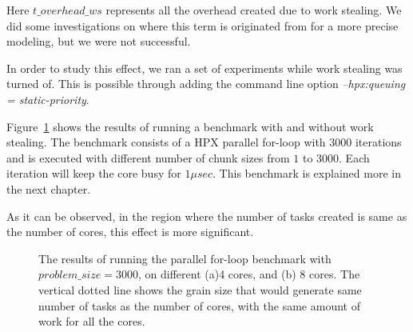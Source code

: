 Here $t\_{overhead\_{ws}}$ represents all the overhead created due to work stealing. We did some investigations on where this term is originated from for a more precise modeling, but we were not successful. 

In order to study this effect, we ran a set of experiments while work stealing was turned of. This is possible through adding the command line option \emph{--hpx:queuing = static-priority}.

Figure~\ref{fig40} shows the results of running a benchmark with and without work stealing. The benchmark consists of a HPX parallel for-loop with $3000$ iterations and is executed with different number of chunk sizes from $1$ to $3000$. Each iteration will keep the core busy for $1\mu{sec}$. This benchmark is explained more in the next chapter.

As it can be observed, in the region where the number of tasks created is same as the number of cores, this effect is more significant.

\vspace{\baselineskip}	
\begin{figure}[H]
	\centering
	\caption{The results of running the parallel for-loop benchmark with $problem\_size=3000$, on different (a)4 cores, and (b) 8 cores. The vertical dotted line shows the grain size that would generate same number of tasks as the number of cores, with the same amount of work for all the cores.}\label{fig40}		
\end{figure}

